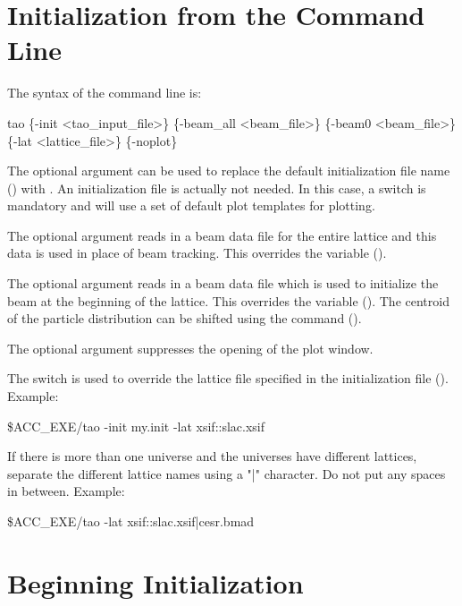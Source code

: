 \section{Initialization from the Command Line}
\label{s:command.line} 

The syntax of the command line is:
\begin{example}
  tao \{-init <tao_input_file>\} \{-beam_all <beam_file>\} 
           \{-beam0 <beam_file>\} \{-lat <lattice_file>\} \{-noplot\}
\end{example}

The  optional argument can be used to replace the default
initialization file name () with .
An initialization file is actually not needed. In this case, a
 switch is mandatory and \tao will use a set of default plot
templates for plotting.

The  optional argument reads in a beam data file for the
entire lattice and this data is used in place of beam tracking. This
overrides the  variable ().

The  optional argument reads in a beam data file which is
used to initialize the beam at the beginning of the lattice. This
overrides the  variable (). The
centroid of the particle distribution can be shifted using the
 command ().

The  optional argument suppresses the opening of the plot window.

The  switch is used to override the 
lattice file specified in the initialization file
(). Example:
\begin{example}
  \$ACC_EXE/tao -init my.init -lat xsif::slac.xsif
\end{example}
If there is more than one universe and the universes have different
lattices, separate the different lattice names using a "|" character.
Do not put any spaces in between. Example:
\begin{example}
  \$ACC_EXE/tao -lat xsif::slac.xsif|cesr.bmad
\end{example}

\section{Beginning Initialization}
\label{s:init.global} 

